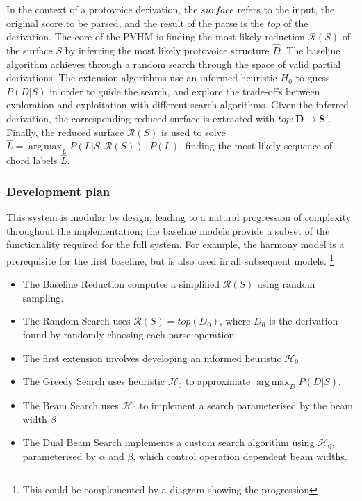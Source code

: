 \documentclass[12pt,a4paper,twoside,openright]{report} \usepackage[pdfborder={0 0 0}]{hyperref}    %
\DeclareMathOperator*{\argmax}{arg\,max} \DeclareMathOperator*{\argmin}{arg\,min}
\theoremstyle{definition} \newtheorem{definition}{Definition}[section]
\begin{document}

    In the context of a protovoice derivation, the $surface$ refers to the input, the original score to be parsed, and
    the result of the parse is the $top$ of the derivation. The core of the PVHM is finding the most likely reduction
    $\mathcal{R}(S)$ of the surface $S$ by inferring the most likely protovoice structure $\hat{D}$. The baseline
    algorithm achieves through a random search through the space of valid partial derivations. The extension algorithms
    use an informed heuristic $H_0$ to guess $P(D|S)$ in order to guide the search, and explore the trade-offs between
    exploration and exploitation with different search algorithms. Given the inferred derivation, the corresponding
    reduced surface is extracted with $top:\mathbf{D} \to \mathbf{S'}$. Finally, the reduced surface $\mathcal{R}(S)$ is
    used to solve $\hat{L} = \argmax_L P(L|S, \mathcal{R}(S)) \cdot P(L)$, finding the most likely sequence of chord
    labels $\hat{L}$. 

    \subsubsection{Development plan} This system is modular by design, leading to a natural progression of complexity
    throughout the implementation; the baseline models provide a subset of the functionality required for the full
    system. For example, the harmony model is a prerequisite for the first baseline, but is also used in all subsequent
    models. \footnote{This could be complemented by a diagram showing the progression}

    \begin{itemize} \item The Baseline Reduction computes a simplified $\mathcal{R}(S)$ using random sampling. \item The
      Random Search uses $\mathcal{R}(S) = top (D_0)$, where $D_0$ is the derivation found by randomly choosing each
      parse operation. \item The first extension involves developing an informed heuristic $\mathcal{H}_0$ \item The
      Greedy Search uses heuristic $\mathcal{H}_0$ to approximate $\argmax_D P(D|S)$. \item The Beam Search uses
      $\mathcal{H}_0$ to implement a search parameterised by the beam width $\beta$ \item The Dual Beam Search
      implements a custom search algorithm using $\mathcal{H}_0$, parameterised by $\alpha$ and $\beta$, which control
      operation dependent beam widths.  \end{itemize}
\end{document}
